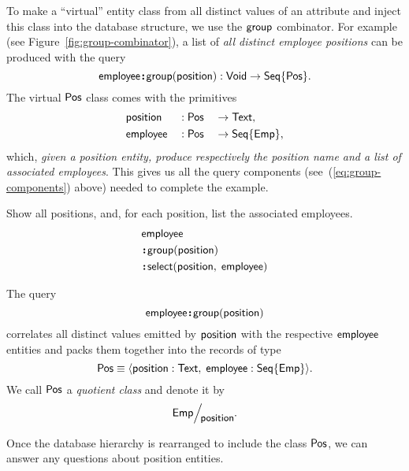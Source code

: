 To make a ``virtual'' entity class from all distinct values of an attribute and
inject this class into the database structure, we use the $\mathsf{group}$ combinator.
For example (see Figure~\ref{fig:group-combinator}), a list of \emph{all
distinct employee positions} can be produced with the query
\begin{equation*}
    \mathsf{employee}\!\boldsymbol{:}\!\mathsf{group}(\mathsf{position}) : \mathsf{Void} \to \mathsf{Seq}{\left\{\mathsf{Pos}\right\}}.
\end{equation*}
The virtual $\mathsf{Pos}$ class comes with the primitives
\begin{alignat*}{3}
    & \mathsf{position} && : \mathsf{Pos} && \to \mathsf{Text}, \\
    & \mathsf{employee} && : \mathsf{Pos} && \to \mathsf{Seq}{\left\{\mathsf{Emp}\right\}},
\end{alignat*}
which, \emph{given a position entity, produce respectively the position name
and a list of associated employees}.
This gives us all the query components (see~(\ref{eq:group-components}) above)
needed to complete the example.



\addtocounter{demo}{-1}
\begin{demo}
    Show all positions, and, for each position, list the associated employees.
    \begin{align*}
        & \mathsf{employee} \\
        & \!\boldsymbol{:}\!\mathsf{group}(\mathsf{position}) \\
        & \!\boldsymbol{:}\!\mathsf{select}(\mathsf{position},\; \mathsf{employee})
    \end{align*}
\end{demo}

The query
\begin{equation*}
    \mathsf{employee}\!\boldsymbol{:}\!\mathsf{group}(\mathsf{position})
\end{equation*}
correlates all distinct values emitted by $\mathsf{position}$ with the respective
$\mathsf{employee}$ entities and packs them together into the records of type
\begin{equation*}
    \mathsf{Pos} \equiv \langle \mathsf{position} : \mathsf{Text},\; \mathsf{employee} : \mathsf{Seq}{\left\{\mathsf{Emp}\right\}} \rangle.
\end{equation*}
We call $\mathsf{Pos}$ a \emph{quotient class} and denote it by
\begin{equation*}
    \Quotient{\Emp}{\Position}.
\end{equation*}

Once the database hierarchy is rearranged to include the class $\mathsf{Pos}$, we can
answer any questions about position entities.

